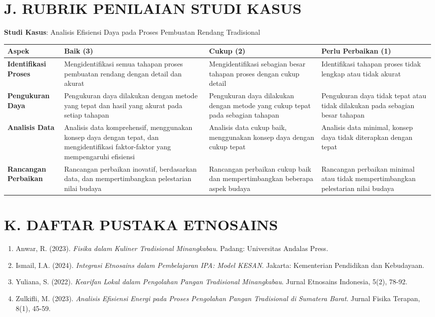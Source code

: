 \documentclass[12pt,a4paper]{article}
\begin{document}
\section*{J. RUBRIK PENILAIAN STUDI KASUS}
\begin{tcolorbox}[colback=white,colframe=black,boxrule=1pt]
\textbf{Studi Kasus}: Analisis Efisiensi Daya pada Proses Pembuatan Rendang Tradisional

\begin{tabular}{|p{3cm}|p{3.5cm}|p{3.5cm}|p{3.5cm}|}
\hline
\textbf{Aspek} & \textbf{Baik (3)} & \textbf{Cukup (2)} & \textbf{Perlu Perbaikan (1)} \\ \hline
\textbf{Identifikasi Proses} & Mengidentifikasi semua tahapan proses pembuatan rendang dengan detail dan akurat & Mengidentifikasi sebagian besar tahapan proses dengan cukup detail & Identifikasi tahapan proses tidak lengkap atau tidak akurat \\ \hline
\textbf{Pengukuran Daya} & Pengukuran daya dilakukan dengan metode yang tepat dan hasil yang akurat pada setiap tahapan & Pengukuran daya dilakukan dengan metode yang cukup tepat pada sebagian tahapan & Pengukuran daya tidak tepat atau tidak dilakukan pada sebagian besar tahapan \\ \hline
\textbf{Analisis Data} & Analisis data komprehensif, menggunakan konsep daya dengan tepat, dan mengidentifikasi faktor-faktor yang mempengaruhi efisiensi & Analisis data cukup baik, menggunakan konsep daya dengan cukup tepat & Analisis data minimal, konsep daya tidak diterapkan dengan tepat \\ \hline
\textbf{Rancangan Perbaikan} & Rancangan perbaikan inovatif, berdasarkan data, dan mempertimbangkan pelestarian nilai budaya & Rancangan perbaikan cukup baik dan mempertimbangkan beberapa aspek budaya & Rancangan perbaikan minimal atau tidak mempertimbangkan pelestarian nilai budaya \\ \hline
\end{tabular}
\end{tcolorbox}

\section*{K. DAFTAR PUSTAKA ETNOSAINS}
\begin{enumerate}[leftmargin=*]
    \item Anwar, R. (2023). \textit{Fisika dalam Kuliner Tradisional Minangkabau}. Padang: Universitas Andalas Press.
    \item Ismail, I.A. (2024). \textit{Integrasi Etnosains dalam Pembelajaran IPA: Model KESAN}. Jakarta: Kementerian Pendidikan dan Kebudayaan.
    \item Yuliana, S. (2022). \textit{Kearifan Lokal dalam Pengolahan Pangan Tradisional Minangkabau}. Jurnal Etnosains Indonesia, 5(2), 78-92.
    \item Zulkifli, M. (2023). \textit{Analisis Efisiensi Energi pada Proses Pengolahan Pangan Tradisional di Sumatera Barat}. Jurnal Fisika Terapan, 8(1), 45-59.
\end{enumerate}
\end{document}
